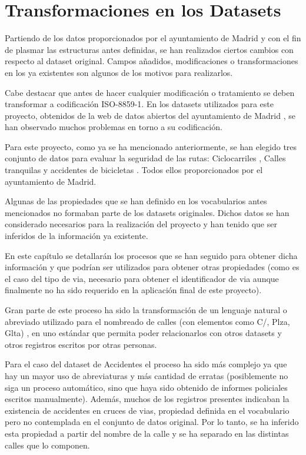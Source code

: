 \chapter{Transformaciones en los Datasets}

Partiendo de los datos proporcionados por el ayuntamiento de Madrid y con el fin de plasmar las estructuras antes definidas, se han realizados ciertos cambios con respecto al dataset original. Campos añadidos, modificaciones o transformaciones en los ya existentes son algunos de los motivos para realizarlos.

Cabe destacar que antes de hacer cualquier modificación o tratamiento se deben transformar a codificación ISO-8859-1. En los datasets utilizados para este proyecto, obtenidos de la web de datos abiertos del ayuntamiento de Madrid \cite{datosabiertos_ayuntmadrid}, se han observado muchos problemas en torno a su codificación.

Para este proyecto, como ya se ha mencionado anteriormente, se han elegido tres conjunto de datos para evaluar la seguridad de las rutas: Ciclocarriles \cite{datosMadrid_ciclocarriles}, Calles tranquilas \cite{datosMadrid_callesTranquilas} y accidentes de bicicletas \cite{datosMadrid_accidentesDeBicicleta}. Todos ellos proporcionados por el ayuntamiento de Madrid.

Algunas de las propiedades que se han definido en los vocabularios antes mencionados no formaban parte de los datasets originales. Dichos datos se han considerado necesarios para la realización del proyecto y han tenido que ser inferidos de la información ya existente.

En este capítulo se detallarán los procesos que se han seguido para obtener dicha información y que podrían ser utilizados para obtener otras propiedades (como es el caso del tipo de via, necesario para obtener el identificador de via aunque finalmente no ha sido requerido en la aplicación final de este proyecto).

Gran parte de este proceso ha sido la transformación de un lenguaje natural o abreviado utilizado para el nombreado de calles (con elementos como C/, Plza, Glta) , en uno estándar que permita poder relacionarlos con otros datasets y otros registros escritos por otras personas.

Para el caso del dataset de Accidentes el proceso ha sido más complejo ya que hay un mayor uso de abreviaturas y más cantidad de erratas (posiblemente no siga un proceso automático, sino que haya sido obtenido de informes policiales escritos manualmente). Además, muchos de los registros presentes indicaban la existencia de accidentes en cruces de vias, propiedad definida en el vocabulario pero no contemplada en el conjunto de datos original. Por lo tanto, se ha inferido esta propiedad a partir del nombre de la calle y se ha separado en las distintas calles que lo componen.

